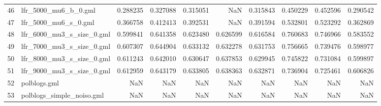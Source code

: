 \begin{tabular}{llrrrrrrrr}
46 &        lfr\_5000\_mu6\_b\_0.gml &                            0.288235 &                       0.327088 &                          0.315051 &                           NaN &                        0.315843 &                     0.450229 &                            0.452596 &                                0.290542 \\
47 &        lfr\_5000\_mu6\_s\_0.gml &                            0.366758 &                       0.412413 &                          0.392531 &                           NaN &                        0.391594 &                     0.532801 &                            0.523292 &                                0.362869 \\
48 &   lfr\_6000\_mu3\_s\_size\_0.gml &                            0.599841 &                       0.641358 &                          0.623480 &                      0.626599 &                        0.616584 &                     0.760683 &                            0.746966 &                                0.583552 \\
49 &   lfr\_7000\_mu3\_s\_size\_0.gml &                            0.607307 &                       0.644904 &                          0.633132 &                      0.632278 &                        0.631753 &                     0.756665 &                            0.739476 &                                0.598977 \\
50 &   lfr\_8000\_mu3\_s\_size\_0.gml &                            0.611243 &                       0.642010 &                          0.630647 &                      0.637853 &                        0.629945 &                     0.745822 &                            0.731084 &                                0.599897 \\
51 &   lfr\_9000\_mu3\_s\_size\_0.gml &                            0.612959 &                       0.643179 &                          0.633805 &                      0.638363 &                        0.632871 &                     0.736904 &                            0.725461 &                                0.606826 \\
52 &                polblogs.gml &                                 NaN &                            NaN &                               NaN &                           NaN &                             NaN &                          NaN &                                 NaN &                                     NaN \\
53 &   polblogs\_simple\_noiso.gml &                                 NaN &                            NaN &                               NaN &                           NaN &                             NaN &                          NaN &                                 NaN &                                     NaN \\
\bottomrule
\end{tabular}
